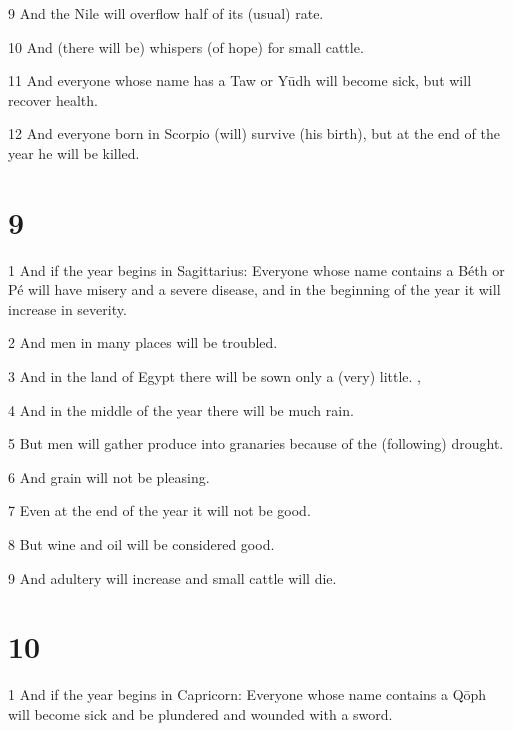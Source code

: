\par 9 And the Nile will overflow half of its (usual) rate.

\par 10 And (there will be) whispers (of hope) for small cattle. 

\par 11 And everyone whose name has a Taw or Yūdh will become sick, but will recover health. 

\par 12 And everyone born in Scorpio (will) survive (his birth), but at the end of the year he will be killed. 

\chapter{9}

\par 1 And if the year begins in Sagittarius: Everyone whose name contains a Béth or Pé will have misery and a severe disease, and in the beginning of the year it will increase in severity. 

\par 2 And men in many places will be troubled. 

\par 3 And in the land of Egypt there will be sown only a (very) little. ,

\par 4 And in the middle of the year there will be much rain. 

\par 5 But men will gather produce into granaries because of the (following) drought. 

\par 6 And grain will not be pleasing. 

\par 7 Even at the end of the year it will not be good.

\par 8 But wine and oil will be considered good. 

\par 9 And adultery will increase and small cattle will die. 

\chapter{10}

\par 1 And if the year begins in Capricorn: Everyone whose name contains a Qōph will become sick and be plundered and wounded with a sword. 


